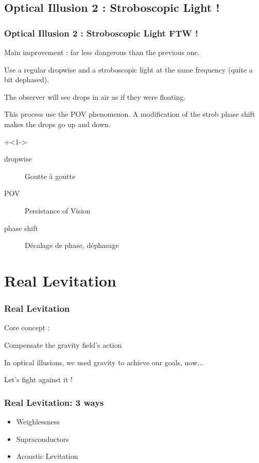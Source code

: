\documentclass{beamer}
\begin{document}
\subsection{Optical Illusion 2 : Stroboscopic Light !}
\begin{frame}
\frametitle{Optical Illusion 2 : Stroboscopic Light FTW !}

Main improvement : far less dangerous than the previous one.

\pause
\medskip

Use a regular dropwise and a stroboscopic light at the same frequency (quite a bit dephased).

The observer will see drops in air as if they were floating.

\pause
\medskip

This process use the POV phenomenon.
A modification of the strob phase shift makes the drops go up and down.

\medskip

\onslide+<1->
\begin{description} 
    \item[dropwise] Goutte à goutte
    \item[POV] Persistance of Vision
    \item[phase shift] Décalage de phase, déphasage
\end{description}
\end{frame}

\section{Real Levitation}
\begin{frame}
\frametitle{Real Levitation}

Core concept :

\begin{center}
Compensate the gravity field's action
\end{center}

\pause

In optical illusions, we used gravity to achieve our goals, now...

\begin{center}
Let's fight against it !
\end{center}
\end{frame}

\begin{frame}
\frametitle{Real Levitation: 3 ways}
\begin{itemize}
    \item Weighlessness
    \item Supraconductors
    \item Acoustic Levitation
\end{itemize}
\end{frame}
\end{document}
